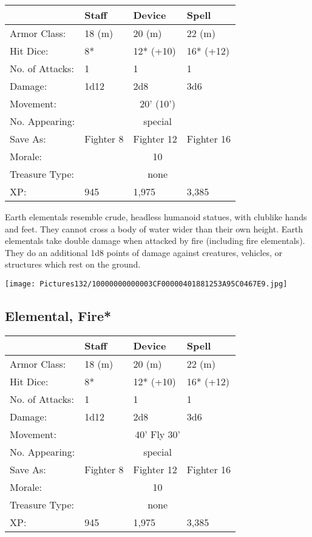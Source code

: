 \documentclass[a4paper,twoside,openany,10pt]{book}
\begin{document}
\begin{multicols}{2}
\begin{tabularx}{0.48\textwidth}{@{}lXXX@{}}
& Staff & Device & Spell \\\hline
Armor Class: & 18 (m) & 20 (m) & 22 (m) \\\hline
Hit Dice: & 8* & 12* (+10) & 16* (+12) \\\hline
No. of Attacks: & 1 & 1 & 1 \\\hline
Damage: & 1d12 & 2d8 & 3d6 \\\hline
Movement: & \multicolumn{3}{c}{20' (10')} \\\hline
No. Appearing: &\multicolumn{3}{c}{special} \\\hline
Save As: & Fighter 8 & Fighter 12 & Fighter 16 \\\hline
Morale: & \multicolumn{3}{c}{10} \\\hline
Treasure Type: & \multicolumn{3}{c}{none} \\\hline
XP: & 945 & 1,975 & 3,385 \\\hline
\end{tabularx}\medskip

Earth elementals resemble crude, headless humanoid statues, with clublike hands and feet. They cannot cross a body of water wider than their own height. Earth elementals take double damage when attacked by fire (including fire elementals). They do an additional 1d8 points of damage against creatures, vehicles, or structures which rest on the ground.

\begin{center}
	\texttt{[image: Pictures132/10000000000003CF00000401881253A95C0467E9.jpg]}
\end{center}

\columnbreak


\subsection*{Elemental, Fire*}\label{elemental-fire}
\begin{tabularx}{0.48\textwidth}{@{}lllX@{}}
& Staff & Device & Spell \\\hline
Armor Class: & 18 (m) & 20 (m) & 22 (m) \\\hline
Hit Dice: & 8* & 12* (+10) & 16* (+12) \\\hline
No. of Attacks: & 1 & 1 & 1 \\\hline
Damage: & 1d12 & 2d8 & 3d6 \\\hline
Movement:  & \multicolumn{3}{c}{40' Fly 30'}\\\hline
No. Appearing: &\multicolumn{3}{c}{special} \\\hline
Save As: & Fighter 8 & Fighter 12 & Fighter 16 \\\hline
Morale: & \multicolumn{3}{c}{10} \\\hline
Treasure Type: & \multicolumn{3}{c}{none} \\\hline
XP: & 945 & 1,975 & 3,385 \\\hline
\end{tabularx}\medskip


\end{multicols}
\end{document}
